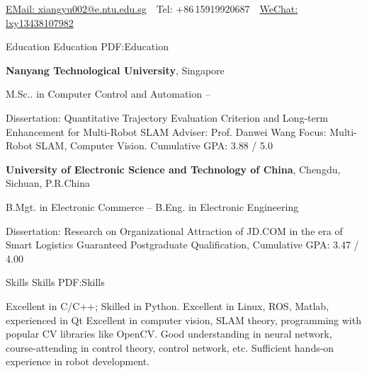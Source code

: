 \documentclass[letterpaper,MMMyyyy,nonstopmode]{simpleresumecv}
\newcommand{\CVAuthor}{Xiangyu Liu}
\newcommand{\CVWebpage}{http://www.example.com/~johndoe}
\begin{document}

\Title{\CVAuthor}

\begin{SubTitle}
\par
\href{xiangyu002@e.ntu.edu.sg}
{EMail: xiangyu002@e.ntu.edu.sg}
\,\SubBulletSymbol\,
Tel: +86\,15919920687
\,\SubBulletSymbol\,
\href{\CVWebpage}
{WeChat: lxy13438107982}
\end{SubTitle}

\begin{Body}


\Section
{Education}
{Education}
{PDF:Education}

\Entry
{\textbf{Nanyang Technological University}},
Singapore

\BulletItem
M.Sc.. in
{Computer Control and Automation}
\hfill
{} --
\begin{Detail}
\SubBulletItem
Dissertation:
{Quantitative Trajectory Evaluation Criterion and Long-term Enhancement for Multi-Robot SLAM}
\SubBulletItem
Adviser:
Prof. Danwei Wang
\SubBulletItem
Focus:
Multi-Robot SLAM, Computer Vision.
\SubBulletItem
Cumulative GPA: 3.88 / 5.0
\end{Detail}

\BigGap
\Entry
{\textbf{University of Electronic Science and Technology of China}},
Chengdu, Sichuan, P.R.China

\BulletItem
B.Mgt. in 
{Electronic Commerce}
\hfill
{} --
\BulletItem
B.Eng. in 
{Electronic Engineering}
\begin{Detail}
\SubBulletItem
Dissertation:
	{Research on Organizational Attraction of JD.COM in the era of Smart Logistics}
\SubBulletItem
Guaranteed Postgraduate Qualification,
\SubBulletItem
Cumulative GPA: 3.47 / 4.00
\end{Detail}


\Section
{Skills}
{Skills}
{PDF:Skills}

\Entry
\BulletItem
Excellent in C/C++; Skilled in Python.
\BulletItem
Excellent in Linux, ROS, Matlab, experienced in Qt
\BulletItem
Excellent in computer vision, SLAM theory, programming with popular CV libraries like OpenCV.
\BulletItem
Good understanding in neural network, course-attending in control theory, control network, etc.
\BulletItem
Sufficient hands-on experience in robot development.


\end{Body}
\end{document}
